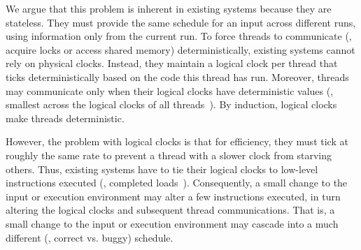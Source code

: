 
We argue that this problem is inherent in existing \dmt systems because
they are stateless.  They must provide the same schedule for an input
across different runs, using information only from the current run.
To force threads to communicate (\eg, acquire locks or access shared memory)
deterministically, existing \dmt systems cannot rely on physical clocks.  Instead, they
maintain a logical clock per thread that ticks deterministically based on
the code this thread has run.  Moreover, threads may communicate only when
their logical clocks have deterministic values (\eg, smallest across the
logical clocks of all threads~\cite{kendo:asplos09}).  By induction,
logical clocks make threads deterministic.




However, the problem with logical clocks is that for efficiency,
they must tick at
roughly the same rate to prevent a thread with a slower clock from
starving others.  Thus, existing \dmt systems have to tie their logical
clocks to low-level instructions executed (\eg, completed
loads~\cite{kendo:asplos09}).  Consequently, a small change to the input or
execution environment may alter a few instructions executed, in turn
altering the logical clocks and subsequent thread communications.  That is,
a small change to the input or execution environment may cascade into a
much different (\eg, correct vs. buggy) schedule.  








